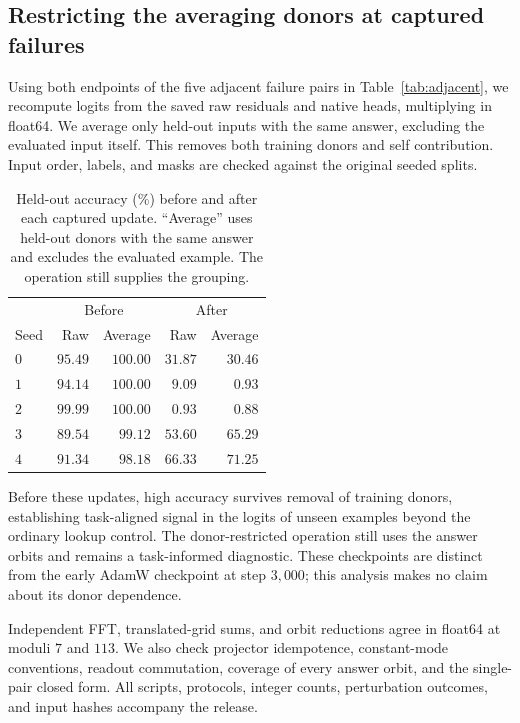 \subsection{Restricting the averaging donors at captured failures}

Using both endpoints of the five adjacent failure pairs in Table~\ref{tab:adjacent}, we recompute logits from the saved raw residuals and native heads, multiplying in float64. We average only held-out inputs with the same answer, excluding the evaluated input itself. This removes both training donors and self contribution. Input order, labels, and masks are checked against the original seeded splits.

\begin{table}[htbp]
\centering\small
\caption{Held-out accuracy (\%) before and after each captured update. ``Average'' uses held-out donors with the same answer and excludes the evaluated example. The operation still supplies the grouping.}
\label{tab:fourier-donors}
\begin{tabular}{lrrrr}
\toprule
 & \multicolumn{2}{c}{Before} & \multicolumn{2}{c}{After} \\
Seed & Raw & Average & Raw & Average \\
\midrule
$0$ & $95.49$ & $100.00$ & $31.87$ & $30.46$ \\
$1$ & $94.14$ & $100.00$ & $9.09$ & $0.93$ \\
$2$ & $99.99$ & $100.00$ & $0.93$ & $0.88$ \\
$3$ & $89.54$ & $99.12$ & $53.60$ & $65.29$ \\
$4$ & $91.34$ & $98.18$ & $66.33$ & $71.25$ \\
\bottomrule
\end{tabular}
\end{table}

Before these updates, high accuracy survives removal of training donors, establishing task-aligned signal in the logits of unseen examples beyond the ordinary lookup control. The donor-restricted operation still uses the answer orbits and remains a task-informed diagnostic. These checkpoints are distinct from the early AdamW checkpoint at step $3{,}000$; this analysis makes no claim about its donor dependence.

Independent FFT, translated-grid sums, and orbit reductions agree in float64 at moduli $7$ and $113$. We also check projector idempotence, constant-mode conventions, readout commutation, coverage of every answer orbit, and the single-pair closed form. All scripts, protocols, integer counts, perturbation outcomes, and input hashes accompany the release.

